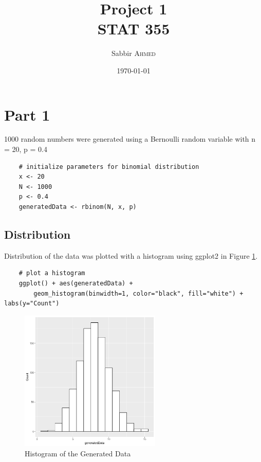 \documentclass{article}
\title{Project 1 \\ STAT 355} %
\author{Sabbir \textsc{Ahmed}} %
\date{\today} %
\begin{document}
    \maketitle %

    \section{Part 1}
        1000 random numbers were generated using a Bernoulli random variable with n = 20, p = 0.4
\begin{lstlisting}
    # initialize parameters for binomial distribution
    x <- 20
    N <- 1000
    p <- 0.4
    generatedData <- rbinom(N, x, p)
\end{lstlisting}

        \subsection{Distribution}
            Distribution of the data was plotted with a histogram using ggplot2 in Figure \ref{fig:hist}.
\begin{lstlisting}
    # plot a histogram
    ggplot() + aes(generatedData) + 
        geom_histogram(binwidth=1, color="black", fill="white") + labs(y="Count")
\end{lstlisting}

            \begin{figure}[h]
                \begin{center}
                    \includegraphics[width=0.6\textwidth]{figures/hist.png}
                    \caption{Histogram of the Generated Data} \label{fig:hist}
                \end{center}
            \end{figure}
\end{document}
